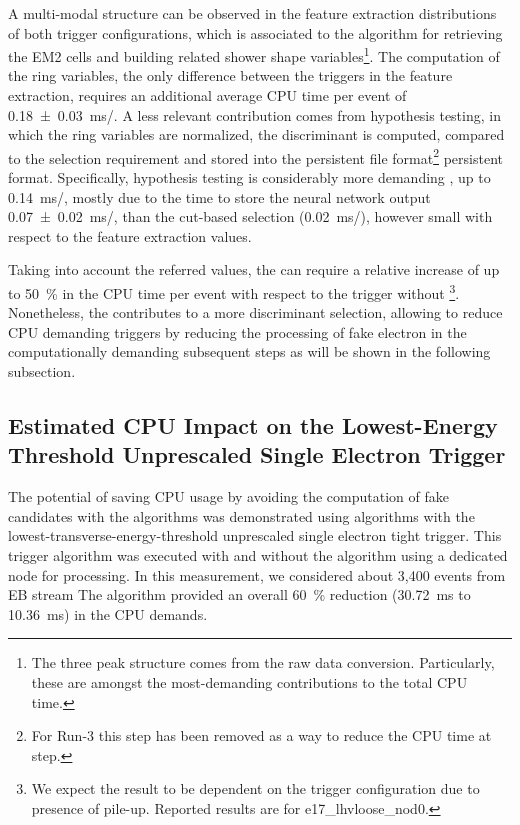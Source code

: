 A multi-modal structure can be observed in the feature extraction distributions
of both trigger configurations, which is associated to the algorithm
for retrieving the EM2 cells and building related shower shape
variables\footnote{The three peak structure comes from the raw data conversion.
	Particularly, these are amongst the most-demanding contributions to
	the \fastcalo total CPU time.}. The computation of the ring variables, the only difference between the
triggers in the \fastcalo feature extraction, requires an additional average CPU time per
event of \SI{0.18 \pm 0.03}{\ms/}. 
A less relevant contribution
comes from hypothesis testing, in which the ring variables are normalized, the
discriminant is computed, compared to the selection requirement and stored into the persistent file format\footnote{For Run-3 this step has been removed as a way to reduce the CPU time at \fastcalo step.} persistent format. 
Specifically, \rnn{} hypothesis testing is considerably more demanding
, up to \SI{0.14}{\ms/}, mostly due to the time 
to store the neural network output \SI{0.07 \pm 0.02}{\ms/}, 
than the cut-based selection
(\SI{0.02}{\ms/}), however small with respect to the feature
extraction values. 


Taking into account the referred values, the \rnn{} can require a
relative increase of up to \SI{50}{\%} in the \fastcalo{} CPU time per event
with respect to the trigger without \rnn{}\footnote{We expect the result to be
	dependent on the trigger configuration due to presence of pile-up. Reported
	results are for e17\_lhvloose\_nod0.}. Nonetheless, the \rnn{} contributes to
a more discriminant selection, allowing to reduce CPU demanding triggers
by reducing the processing of fake electron in the computationally demanding
subsequent steps as will be shown in the following subsection.

\FloatBarrier
\subsection{Estimated CPU Impact on the Lowest-Energy Threshold Unprescaled Single Electron Trigger}\label{top:cpu_e26}

The potential of saving CPU usage by
avoiding the computation of fake candidates with the \rnn algorithms was demonstrated using algorithms with the lowest-transverse-energy-threshold unprescaled single electron tight trigger. This trigger algorithm was executed with
and without the \rnn{} algorithm using a dedicated node for processing.
In this measurement, we considered about 3,400 events from EB stream %
The \rnn{} algorithm provided an overall
\SI{60}{\%} reduction (\SI{30.72}{\milli\second} to \SI{10.36}{\milli\second})
in the CPU demands.


